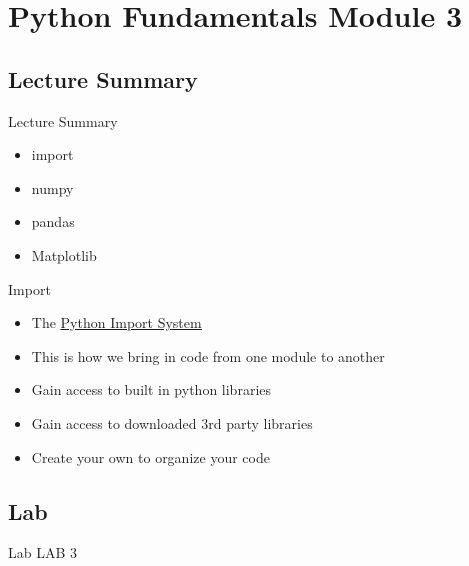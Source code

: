 \section{Python Fundamentals Module 3}

\subsection{Lecture Summary}
\begin{Slide}{Lecture Summary}
  \begin{itemize}
  \item import
  \item numpy
  \item pandas
  \item Matplotlib
  \end{itemize}
\end{Slide}

% 
% 
% 
\begin{Slide}{Import}
  \begin{itemize}
  \item The \underline{\href{https://docs.python.org/3/reference/import.html}{Python Import System}}
  \item This is how we bring in code from one module to another
  \item Gain access to built in python libraries
  \item Gain access to downloaded 3rd party libraries
  \item Create your own to organize your code
  \end{itemize}
\end{Slide}


\subsection{Lab}
\begin{Slide}{Lab}
  LAB 3
\end{Slide}
